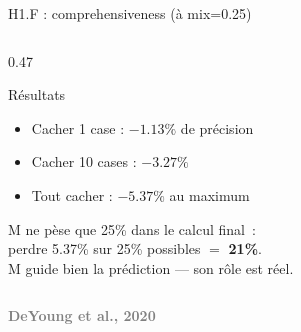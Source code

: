 \documentclass[10pt]{beamer}
\newcommand{\source}[1]{\vspace{4pt}\hfill{\textcolor{gray}{\textbf{\tiny #1}}}}
\begin{document}
\begin{frame}{H1.F : comprehensiveness \quad\small (à mix=0.25)}
\begin{columns}
\begin{column}{0.47\textwidth}
      \begin{exampleblock}{Résultats}
        \footnotesize
        \begin{itemize}\setlength{\itemsep}{0pt}
          \item Cacher 1 case : $-1.13\%$ de précision
          \item Cacher 10 cases : $-3.27\%$
          \item Tout cacher : $-5.37\%$ au maximum
        \end{itemize}
      \end{exampleblock}

      \begin{verdictbox}
        \centering\footnotesize
        M ne pèse que 25\% dans le calcul final~:\\
        perdre 5.37\% sur 25\% possibles $=$ \textbf{21\%}.\\[2pt]
        M guide bien la prédiction --- \alert{son rôle est réel}.
      \end{verdictbox}
    \end{column}
  \end{columns}

  \source{DeYoung et al., 2020}
\end{frame}
\end{document}
